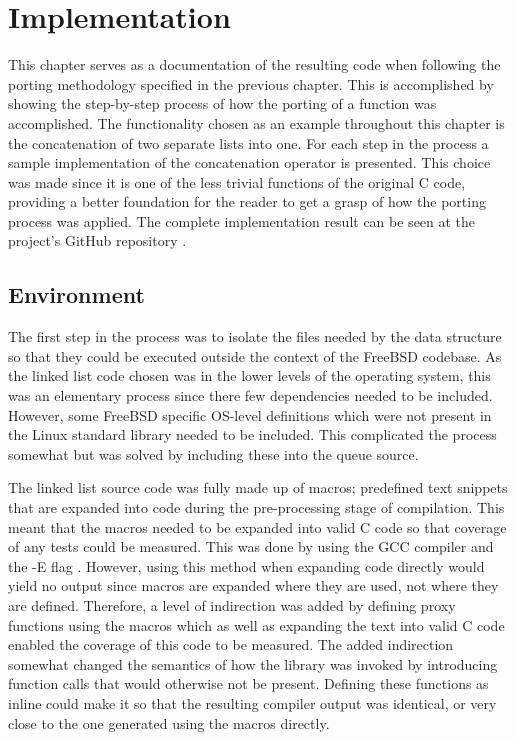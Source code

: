 \section{Implementation}\label{result}

This chapter serves as a documentation of the resulting code when following the porting methodology specified in the previous chapter. This is accomplished by showing the step-by-step process of how the porting of a function was accomplished. The functionality chosen as an example throughout this chapter is the concatenation of two separate lists into one. For each step in the process a sample implementation of the concatenation operator is presented. This choice was made since it is one of the less trivial functions of the original C code, providing a better foundation for the reader to get a grasp of how the porting process was applied. The complete implementation result can be seen at the project's GitHub repository \cite{LINKEDLISTREPO}.

\subsection{Environment}

The first step in the process was to isolate the files needed by the data structure so that they could be executed outside the context of the FreeBSD codebase. As the linked list code chosen was in the lower levels of the operating system, this was an elementary process since there few dependencies needed to be included. However, some FreeBSD specific OS-level definitions which were not present in the Linux standard library needed to be included. This complicated the process somewhat but was solved by including these into the queue source.

The linked list source code was fully made up of macros; predefined text snippets that are expanded into code during the pre-processing stage of compilation. This meant that the macros needed to be expanded into valid C code so that coverage of any tests could be measured. This was done by using the GCC compiler and the -E flag \cite{gcc_man}. However, using this method when expanding code directly would yield no output since macros are expanded where they are used, not where they are defined. Therefore, a level of indirection was added by defining proxy functions using the macros which as well as expanding the text into valid C code enabled the coverage of this code to be measured. The added indirection somewhat changed the semantics of how the library was invoked by introducing function calls that would otherwise not be present. Defining these functions as inline could make it so that the resulting compiler output was identical, or very close to the one generated using the macros directly.
    

